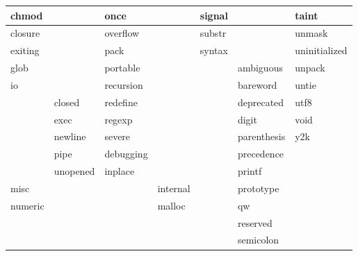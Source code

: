 \documentclass[a4paper,11pt]{book}
\begin{document}
\begin{tabular}{|p{1.0in}|p{0.6in}|p{0.4in}|p{0.6in}|p{0.4in}|p{0.6in}|p{0.4in}|} \hline 
chmod &  & once &  & signal &  & taint \\ \hline 
\newline closure &  & \newline overflow &  & \newline substr &  & \newline unmask \\ \hline 
exiting &  & \newline pack &  & syntax &  & \newline uninitialized \\ \hline 
glob &  & \newline portable &  &  & ambiguous & \newline unpack \\ \hline 
\newline io &  & \newline recursion &  &  & \newline bareword & \newline untie \\ \hline 
 & \newline closed & \newline redefine &  &  & \newline deprecated & \newline utf8 \\ \hline 
 & exec & regexp &  &  & digit & \newline void \\ \hline 
 & \newline newline & severe &  &  & \newline parenthesis & y2k \\ \hline 
 & \newline pipe & debugging &  &  & \newline precedence &  \\ \hline 
 & \newline unopened & inplace &  &  & \newline printf &  \\ \hline 
\newline misc &  &  & \newline internal &  & prototype &  \\ \hline 
\newline numeric &  &  & \newline malloc &  & qw &  \\ \hline 
 &  &  &  &  & \newline reserved &  \\ \hline 
 &  &  &  &  & \newline semicolon &  \\ \hline 
\end{tabular}
\end{document}
